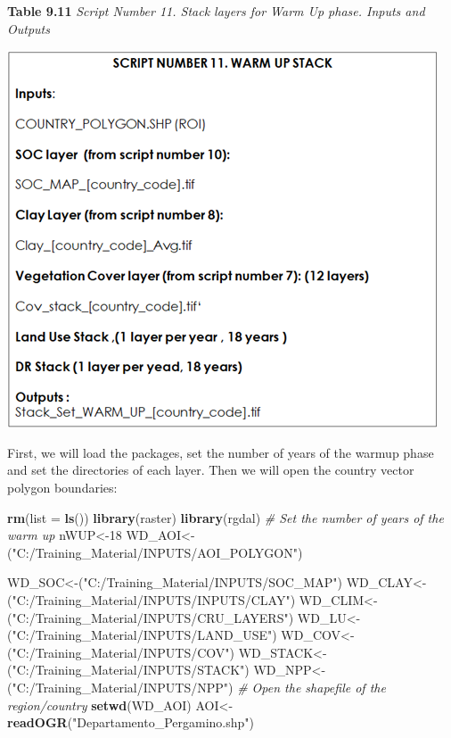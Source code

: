 \documentclass[
  10pt,
  b5paper,
]{book}
\newenvironment{Shaded}{\begin{snugshade}}{\end{snugshade}}
\newcommand{\CommentTok}[1]{\textcolor[rgb]{0.56,0.35,0.01}{\textit{#1}}}
\newcommand{\DataTypeTok}[1]{\textcolor[rgb]{0.13,0.29,0.53}{#1}}
\newcommand{\DecValTok}[1]{\textcolor[rgb]{0.00,0.00,0.81}{#1}}
\newcommand{\KeywordTok}[1]{\textcolor[rgb]{0.13,0.29,0.53}{\textbf{#1}}}
\newcommand{\NormalTok}[1]{#1}
\newcommand{\StringTok}[1]{\textcolor[rgb]{0.31,0.60,0.02}{#1}}
\begin{document}
\textbf{Table 9.11} \emph{Script Number 11. Stack layers for Warm Up phase. Inputs and Outputs}

\includegraphics{tables/Table_9.10.png}

First, we will load the packages, set the number of years of the warmup phase and set the directories of each layer. Then we will open the country vector polygon boundaries:

\begin{Shaded}
\begin{Highlighting}[]
\KeywordTok{rm}\NormalTok{(}\DataTypeTok{list =} \KeywordTok{ls}\NormalTok{())}
\KeywordTok{library}\NormalTok{(raster)}
\KeywordTok{library}\NormalTok{(rgdal)}
\CommentTok{# Set the number of years of the warm up}
\NormalTok{nWUP<-}\DecValTok{18}
\NormalTok{WD_AOI<-(}\StringTok{"C:/Training_Material/INPUTS/AOI_POLYGON"}\NormalTok{)}

\NormalTok{WD_SOC<-(}\StringTok{"C:/Training_Material/INPUTS/SOC_MAP"}\NormalTok{)}
\NormalTok{WD_CLAY<-(}\StringTok{"C:/Training_Material/INPUTS/INPUTS/CLAY"}\NormalTok{)}
\NormalTok{WD_CLIM<-(}\StringTok{"C:/Training_Material/INPUTS/CRU_LAYERS"}\NormalTok{)}
\NormalTok{WD_LU<-(}\StringTok{"C:/Training_Material/INPUTS/LAND_USE"}\NormalTok{)}
\NormalTok{WD_COV<-(}\StringTok{"C:/Training_Material/INPUTS/COV"}\NormalTok{)}
\NormalTok{WD_STACK<-(}\StringTok{"C:/Training_Material/INPUTS/STACK"}\NormalTok{)}
\NormalTok{WD_NPP<-(}\StringTok{"C:/Training_Material/INPUTS/NPP"}\NormalTok{)}
\CommentTok{# Open the shapefile of the region/country}
\KeywordTok{setwd}\NormalTok{(WD_AOI)}
\NormalTok{AOI<-}\KeywordTok{readOGR}\NormalTok{(}\StringTok{"Departamento_Pergamino.shp"}\NormalTok{)}
\end{Highlighting}
\end{Shaded}
\end{document}
